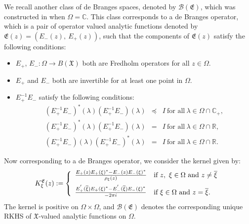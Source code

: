 \documentclass [12pt,reqno]{amsart}
\numberwithin{equation}{subsection}
\numberwithin{equation}{section}
\begin{document}
We recall another class of de Branges spaces, denoted by $\mathcal{B}(\mathfrak{E})$, which was constructed in \cite{mahapatra} when $\Omega =\mathbb{C}$. This class corresponds to a de Branges operator, which is a pair of operator valued analytic functions denoted by $\mathfrak{E}(z)=(E_-(z),~ E_+(z))$, such that the components of $\mathfrak{E}(z)$ satisfy the following conditions:
\begin{itemize}
\item[(1)] $E_+$, $E_- : \Omega \rightarrow B(\mathfrak{X})$ both are Fredholm operators for all $z \in \Omega$.
\item[(2)] $E_+$ and $E_- $ both are invertible for at least one point in $\Omega$.
\item[(3)] $E_+^{-1}E_-$ satisfy the following conditions:
\begin{eqnarray*}(E_+^{-1}E_-)^*(\lambda)(E_+^{-1}E_-)(\lambda) &\preceq & I ~\mbox{for all}~ \lambda \in \Omega\cap \mathbb{C}_+, \\
(E_+^{-1}E_-)^*(\lambda)(E_+^{-1}E_-)(\lambda) &=& I ~\mbox{for all}~ \lambda \in \Omega\cap \mathbb{R},\\
(E_+^{-1}E_-)(\lambda)(E_+^{-1}E_-)^*(\lambda)&=& I ~\mbox{for all}~ \lambda \in \Omega\cap \mathbb{R}.
\end{eqnarray*}
\end{itemize}
Now corresponding to a de Branges operator, we consider the kernel given by: \begin{equation} \label{Equation 2.4}
K_\xi^{\mathfrak{E}}(z):= \left\{
    \begin{array}{ll}
         \frac{E_+(z)E_+(\xi)^*-E_-(z)E_-(\xi)^*}{\rho_\xi(z)}  & \mbox{if } z,~\xi \in \Omega~\mbox{and}~z \neq \overline{\xi} \vspace{0.2cm}\\
         \frac{E_+^{'} (\overline{\xi})E_+(\xi)^*- E_-^{'}(\overline{\xi})E_-(\xi)^*}{-2\pi i} & \mbox{if }\xi \in \Omega~\mbox{and}~ z = \overline{\xi}.
    \end{array} \right.
\end{equation} 
The kernel is positive on  $\Omega \times \Omega$, and $\mathcal{B}(\mathfrak{E})$ denotes the corresponding unique RKHS of $\mathfrak{X}$-valued analytic functions on $\Omega$.


\end{document}
